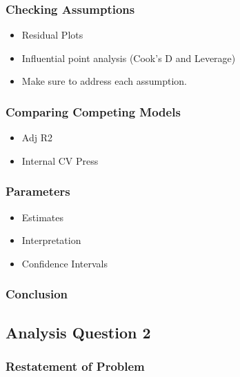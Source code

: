 \documentclass[
]{article}
\providecommand{\tightlist}{%
  \setlength{\itemsep}{0pt}\setlength{\parskip}{0pt}}
\begin{document}
\hypertarget{checking-assumptions}{%
\subsubsection{Checking Assumptions}\label{checking-assumptions}}

\begin{itemize}
\tightlist
\item
  Residual Plots
\item
  Influential point analysis (Cook's D and Leverage)
\item
  Make sure to address each assumption.
\end{itemize}

\hypertarget{comparing-competing-models}{%
\subsubsection{Comparing Competing
Models}\label{comparing-competing-models}}

\begin{itemize}
\tightlist
\item
  Adj R2\\
\item
  Internal CV Press
\end{itemize}

\hypertarget{parameters}{%
\subsubsection{Parameters}\label{parameters}}

\begin{itemize}
\tightlist
\item
  Estimates
\item
  Interpretation
\item
  Confidence Intervals
\end{itemize}

\hypertarget{conclusion}{%
\subsubsection{Conclusion}\label{conclusion}}

\hypertarget{analysis-question-2}{%
\subsection{Analysis Question 2}\label{analysis-question-2}}

\hypertarget{restatement-of-problem-1}{%
\subsubsection{Restatement of Problem}\label{restatement-of-problem-1}}
\end{document}
